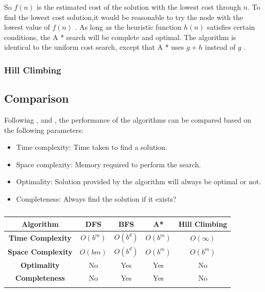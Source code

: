 \documentclass[12pt]{article}
\begin{document}
So $f(n)$ is the estimated cost of the solution with the lowest cost through $n$.
To find the lowest cost solution,it would be reasonable to try the node with the lowest value of $f(n)$ . As long as the heuristic function $h(n)$ satisfies certain conditions, the A * search will be complete and optimal. The algorithm is identical to the uniform cost search, except that A * uses $g + h$ instead of $g$ \cite{russell2004inteligencia}.


\subsubsection{Hill Climbing}


\subsection{Comparison}
Following \cite{Maharshi2018ComparativeAO}, \cite{HLweb} and \cite{stuart2003artificial}, the performance of the algorithms can be compared based on the following parameters:
\begin{itemize}
    \item Time complexity: Time taken to find a solution.
    \item Space complexity: Memory required to perform the search.
    \item Optimality: Solution provided by the algorithm will always be optimal or not.
    \item Completeness: Always find the solution if it exists?
\end{itemize}
\begin{longtable}[c]{|c|c|c|c|c|}
\hline
\textbf{Algorithm}        & \textbf{DFS} & \textbf{BFS} & \textbf{A*} & \textbf{Hill Climbing} \\ \hline
\endhead
%
\textbf{Time Complexity}  & $O(b^{m})$   & $O(b^{d})$   & $O(b^{m})$  & $O(\infty)$            \\ \hline
\textbf{Space Complexity} & $O(bm)$      & $O(b^{d})$   & $O(b^{m})$  & $O(b^{m})$             \\ \hline
\textbf{Optimality}       & No           & Yes          & Yes         & No                     \\ \hline
\textbf{Completeness}     & No           & Yes          & Yes         & No                     \\ \hline
\caption{}
\label{tab:my-table}\\
\end{longtable}
\end{document}
